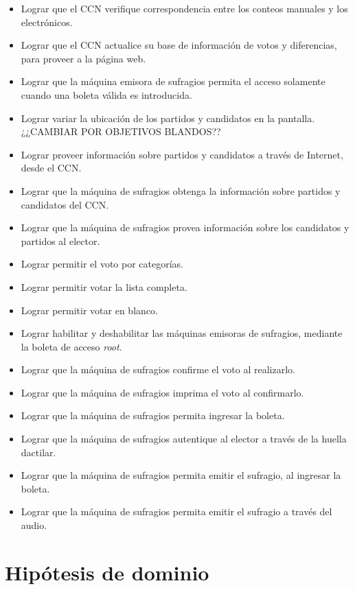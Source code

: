 \documentclass[spanish, 10pt,a4paper]{article}
\numberwithin{equation}{section} %
\begin{document}
\begin{itemize}
\item Lograr que el CCN verifique correspondencia entre los conteos manuales y los electrónicos.
\item Lograr que el CCN actualice su base de información de votos y diferencias, para proveer a la página web.
\item Lograr que la máquina emisora de sufragios permita el acceso solamente cuando una boleta válida es introducida.
\item Lograr variar la ubicación de los partidos y candidatos en la pantalla. ¿¿CAMBIAR POR OBJETIVOS BLANDOS??
\item Lograr proveer información sobre partidos y candidatos a través de Internet, desde el CCN.
\item Lograr que la máquina de sufragios obtenga la información sobre partidos y candidatos del CCN.
\item Lograr que la máquina de sufragios provea información sobre los candidatos y partidos al elector.
\item Lograr permitir el voto por categorías.
\item Lograr permitir votar la lista completa.
\item Lograr permitir votar en blanco.
\item Lograr habilitar y deshabilitar las máquinas emisoras de sufragios, mediante la boleta de acceso \emph{root}.
\item Lograr que la máquina de sufragios confirme el voto al realizarlo.
\item Lograr que la máquina de sufragios imprima el voto al confirmarlo.
\item Lograr que la máquina de sufragios permita ingresar la boleta.
\item Lograr que la máquina de sufragios autentique al elector a través de la huella dactilar.
\item Lograr que la máquina de sufragios permita emitir el sufragio, al ingresar la boleta.
\item Lograr que la máquina de sufragios permita emitir el sufragio a través del audio.

\end{itemize}

\section{Hipótesis de dominio}
\end{document}
